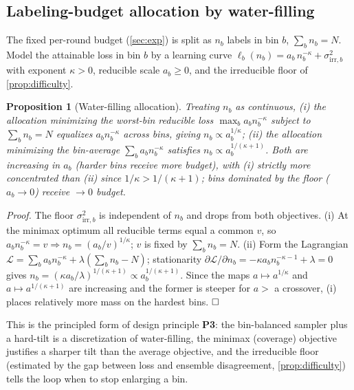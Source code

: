\documentclass{article}
\theoremstyle{plain}
\newtheorem{proposition}{Proposition}
\theoremstyle{definition}
\theoremstyle{remark}
\begin{document}
\subsection{Labeling-budget allocation by water-filling}\label{app:budget}
The fixed per-round budget (\cref{sec:exp}) is split as $n_b$ labels in bin $b$, $\sum_b n_b=N$. Model the
attainable loss in bin $b$ by a learning curve $\ell_b(n_b)=a_b\,n_b^{-\kappa}+\sigma^2_{\mathrm{irr},b}$
with exponent $\kappa>0$, reducible scale $a_b\ge0$, and the irreducible floor of \cref{prop:difficulty}.
\begin{proposition}[Water-filling allocation]\label{prop:budget}
Treating $n_b$ as continuous, (i) the allocation minimizing the worst-bin reducible loss
$\max_b a_b n_b^{-\kappa}$ subject to $\sum_b n_b=N$ equalizes $a_b n_b^{-\kappa}$ across bins, giving
$n_b\propto a_b^{1/\kappa}$; (ii) the allocation minimizing the bin-average
$\sum_b a_b n_b^{-\kappa}$ satisfies $n_b\propto a_b^{1/(\kappa+1)}$. Both are increasing in $a_b$ (harder
bins receive more budget), with (i) strictly more concentrated than (ii) since $1/\kappa>1/(\kappa+1)$;
bins dominated by the floor ($a_b\!\to\!0$) receive $\to0$ budget.
\end{proposition}
\emph{Proof.} The floor $\sigma^2_{\mathrm{irr},b}$ is independent of $n_b$ and drops from both objectives.
(i) At the minimax optimum all reducible terms equal a common $v$, so $a_b n_b^{-\kappa}=v\Rightarrow
n_b=(a_b/v)^{1/\kappa}$; $v$ is fixed by $\sum_b n_b=N$. (ii) Form the Lagrangian
$\mathcal L=\sum_b a_b n_b^{-\kappa}+\lambda(\sum_b n_b-N)$; stationarity
$\partial\mathcal L/\partial n_b=-\kappa a_b n_b^{-\kappa-1}+\lambda=0$ gives
$n_b=(\kappa a_b/\lambda)^{1/(\kappa+1)}\propto a_b^{1/(\kappa+1)}$. Since the maps $a\mapsto a^{1/\kappa}$
and $a\mapsto a^{1/(\kappa+1)}$ are increasing and the former is steeper for $a>$ a crossover, (i) places
relatively more mass on the hardest bins. $\hfill\square$

This is the principled form of design principle \textbf{P3}: the bin-balanced sampler plus a hard-tilt is
a discretization of water-filling, the minimax (coverage) objective justifies a sharper tilt than the
average objective, and the irreducible floor (estimated by the gap between loss and ensemble disagreement,
\cref{prop:difficulty}) tells the loop when to stop enlarging a bin.
\end{document}
